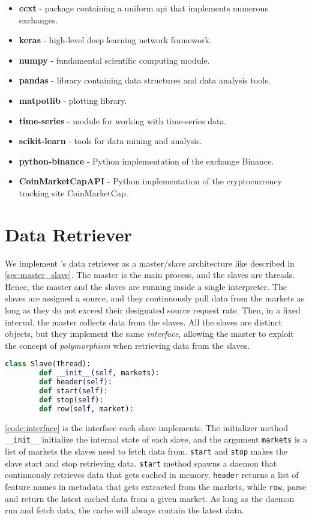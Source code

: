 \begin{itemize}
    \item \textbf{ccxt} - package containing a uniform \ac{api} that implements numerous exchanges.
    \item \textbf{keras} - high-level deep learning network framework.
    \item \textbf{numpy} - fundamental scientific computing module.
    \item \textbf{pandas} - library containing data structures and data analysis tools.
    \item \textbf{matpotlib} - plotting library.
    \item \textbf{time-series} - module for working with time-series data.  
    \item \textbf{scikit-learn} - tools for data mining and analysis.
    \item \textbf{python-binance} - Python implementation of the exchange Binance.
    \item \textbf{CoinMarketCapAPI} - Python implementation of the cryptocurrency tracking site CoinMarketCap.
\end{itemize}

\section{Data Retriever}
We implement \project's data retriever as a master/slave architecture like described in \autoref{sec:master_slave}. The master is the main process, and the slaves are threads. Hence, the master and the slaves are running inside a single interpreter. The slaves are assigned a source, and they continuously pull data from the markets as long as they do not exceed their designated source request rate. Then, in a fixed interval, the master collects data from the slaves. All the slaves are distinct objects, but they implement the same \emph{interface}, allowing the master to exploit the concept of \emph{polymorphism} when retrieving data from the slaves.

\newpage
\begin{lstlisting}[language=python, caption={Data retriever's slave interface}, label=code:interface]
    class Slave(Thread):
        def __init__(self, markets):
        def header(self):
        def start(self):
        def stop(self):
        def row(self, market):
\end{lstlisting}

\autoref{code:interface} is the interface each slave implements. The initializer method \texttt{\_\_init\_\_} initialize the internal state of each slave, and the argument \texttt{markets} is a list of markets the slaves need to fetch data from. \texttt{start} and \texttt{stop} makes the slave start and stop retrieving data. \texttt{start} method spawns a daemon that continuously retrieves data that gets cached in memory. \texttt{header} returns a list of feature names in metadata that gets extracted from the markets, while \texttt{row}, parse and return the latest cached data from a given market. As long as the daemon run and fetch data, the cache will always contain the latest data.

